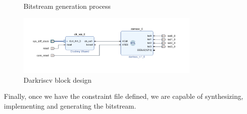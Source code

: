 \begin{figure}[h]
    \centering
    \caption{Bitstream generation process}
    \label{fig:bitstream_gen}
\end{figure}

\begin{figure}[h]
  \centering
  \includegraphics[width=0.8\textwidth]{../presentation/images/block-design.png}
  \caption{Darkriscv block design}
  \label{fig:block_design}
\end{figure}

Finally, once we have the constraint file defined, we are capable of synthesizing, implementing and generating the bitstream. 

